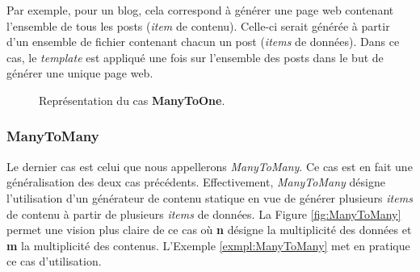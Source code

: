 			\newpage
			
			\begin{exmpl}
				\label{exmpl:ManyToOne}
				Par exemple, pour un blog, cela correspond à générer une page web contenant l'ensemble de tous les posts (\textit{item} de contenu). Celle-ci serait générée à partir d'un ensemble de fichier contenant chacun un post (\textit{items} de données). Dans ce cas, le \textit{template} est appliqué une  fois sur l'ensemble des posts dans le but de générer une unique page web.
			\end{exmpl}
		
			\begin{figure}[!]
				\begin{center}
					\caption{Représentation du cas \textbf{ManyToOne}.}
					\label{fig:ManyToOne}
				\end{center}
			\end{figure}
			
		\subsubsection*{ManyToMany}
			
			Le dernier cas est celui que nous appellerons \textit{ManyToMany}. Ce cas est en fait une généralisation des deux cas précédents. Effectivement, \textit{ManyToMany} désigne l'utilisation d'un générateur de contenu statique en vue de générer plusieurs \textit{items} de contenu à partir de plusieurs \textit{items} de données. La Figure \ref{fig:ManyToMany} permet une vision plus claire de ce cas où \textbf{n} désigne la multiplicité des données et \textbf{m} la multiplicité des contenus. L'Exemple \ref{exmpl:ManyToMany} met en pratique ce cas d'utilisation.\\
			
